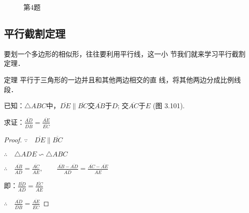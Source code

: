 \begin{figure}[htp]
    \centering
{}
    \caption*{第4题}
\end{figure}

\subsection{平行截割定理}
要划一个多边形的相似形，往往要利用平行线，这一小
节我们就来学习平行截割定理．

\begin{blk}
    {定理} 平行于三角形的一边并且和其他两边相交的直
线，将其他两边分成比例线段．
\end{blk}

已知：$\triangle ABC$中，$\overline{DE}\parallel \overline{BC}$交$\overline{AB}$于$D$; 交$\overline{AC}$于$E$ (图
3.101).

求证：$\frac{\overline{AD}}{\overline{DB}}=\frac{\overline{AE}}{\overline{EC}}$

\begin{proof}
$\because\quad  \overline{DE}\parallel \overline{BC}$

$\therefore\quad \triangle ADE\backsim \triangle ABC$

$\therefore\quad \frac{\overline{AB}}{\overline{AD}}=\frac{\overline{AC}}{\overline{AE}},\qquad \frac{\overline{AB}-\overline{AD}}{\overline{AD}}=\frac{\overline{AC}-\overline{AE}}{\overline{AE}}$

即：$\frac{\overline{BD}}{\overline{AD}}=\frac{\overline{EC}}{\overline{AE}}$

$\therefore\quad \frac{\overline{AD}}{\overline{DB}}=\frac{\overline{AE}}{\overline{EC}}$
\end{proof}

